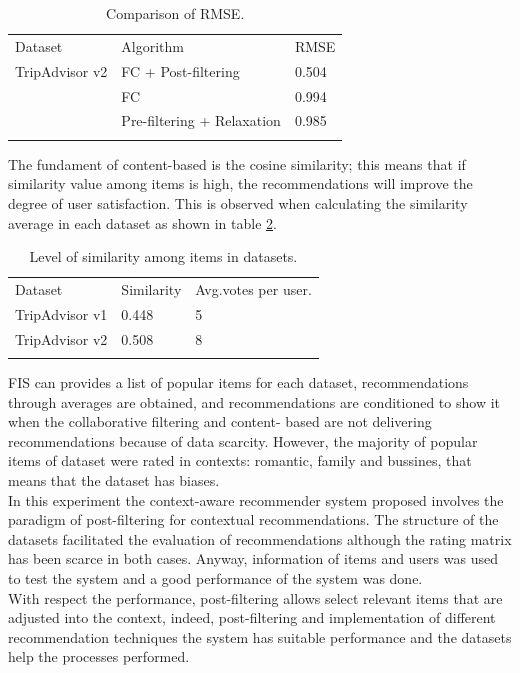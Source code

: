 \begin{table}
\centering
\small
\captionsetup{font=footnotesize}
\caption{Comparison of RMSE.}
\label{tab:4}  
\small   
\begin{tabular}{lll}
\hline\noalign{\smallskip}
Dataset & Algorithm & RMSE \\
\noalign{\smallskip}\hline\noalign{\smallskip}
TripAdvisor v2 & FC + Post-filtering  & 0.504  \\
               & FC          & 0.994  \\
               & Pre-filtering + Relaxation & 0.985  \\
\noalign{\smallskip}\hline
\end{tabular}
\end{table}

The fundament of content-based is the cosine similarity; this means
that if similarity value among items is high, the recommendations will
improve the degree of user satisfaction. This is observed when
calculating the similarity average in each dataset as shown in table
\ref{tab:5}.
\begin{table}
\centering
\small
\captionsetup{font=footnotesize}
\caption{Level of similarity among items in datasets. }
\label{tab:5}      
\begin{tabular}{lll}
\hline\noalign{\smallskip}
Dataset  & Similarity  & Avg.votes per user. \\
\noalign{\smallskip}\hline\noalign{\smallskip}
TripAdvisor v1 & 0.448  & 5  \\
TripAdvisor v2 & 0.508  & 8  \\
\noalign{\smallskip}\hline
\end{tabular}
\end{table}

FIS can provides a list of popular items for each dataset,
recommendations through averages are obtained, and recommendations are
conditioned to show it when the collaborative filtering and content-
based are not delivering recommendations because of data scarcity.
However, the majority of popular items of dataset were rated in contexts: romantic, family and bussines, that means that the dataset has
biases.\\  In this experiment  the context-aware recommender system
proposed involves the paradigm of post-filtering for contextual
recommendations. The structure of the datasets facilitated the
evaluation of recommendations although the rating matrix has been
scarce in both cases. Anyway, information of items and users was used
to test the system and a good performance of the system was done.\\   With
respect the performance, post-filtering allows select relevant
items that are adjusted into the context, indeed, post-filtering and
implementation of different recommendation techniques the system has
suitable performance and the datasets help the processes performed.

